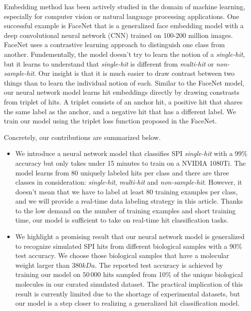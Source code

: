 Embedding method has been actively studied in the domain of machine learning,
especially for computer vision or natural language processing applications.  One
successful example is FaceNet \cite{schroffFaceNetUnifiedEmbedding2015} that is
a generalized face embedding model with a deep convolutional neural network (CNN)
trained on 100-200 million images.  FaceNet uses a contrastive learning approach
to distinguish one class from another.  Fundementally, the model doesn't try to
learn the notion of a \textit{single-hit}, but it learns to understand that
\textit{single-hit} is different from \textit{multi-hit} or
\textit{non-sample-hit}.  Our insight is that it is much easier to draw contrast
between two things than to learn the individual notion of each.  Similar to the
FaceNet model, our neural network model learns hit embeddings directly by
drawing constrasts from triplet of hits.  A triplet consists of an anchor hit, a
positive hit that shares the same label as the anchor, and a negative hit that
has a different label.  We train our model using the triplet loss function
proposed in the FaceNet.  

Concretely, our contributions are summarized below.  

\begin{itemize}

    \item We introduce a neural network model that classifies SPI
    \textit{single-hit} with a 99\% accuracy but only takes under 15 minutes to
    train on a NVIDIA 1080Ti.  The model learns from 80 uniquely labeled hits
    per class and there are three classes in consideration: \textit{single-hit},
    \textit{multi-hit} and \textit{non-sample-hit}.  However, it doesn't mean
    that we have to label at least 80 training examples per class, and we will
    provide a real-time data labeling strategy in this article.  Thanks to the
    low demand on the number of training examples and short training time, our
    model is sufficient to take on real-time hit classification tasks.  

    \item We highlight a promising result that our neural network model is
    generalized to recognize simulated SPI hits from different biological
    samples with a 90\% test accuracy.  We choose those biological samples that
    have a molecular weight larger than $380 kDa$.  The reported test accuracy
    is achieved by training our model on $50\,000$ hits sampled from 10\% of the
    unique biological molecules in our curated simulated dataset.  The practical
    implication of this result is currently limited due to the shortage of
    experimental datasets, but our model is a step closer to realizing a
    generalized hit classification model.

\end{itemize}
